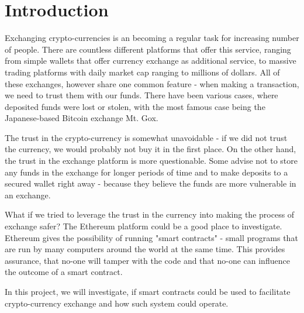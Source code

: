 \section{Introduction}
% 
Exchanging crypto-currencies is an becoming a regular task for increasing number of people. There are countless different platforms that offer this service, ranging from simple wallets that offer currency exchange as additional service, to massive trading platforms with daily market cap ranging to millions of dollars. All of these exchanges, however share one common feature - when making a transaction, we need to trust them with our funds. There have been various cases, where deposited funds were lost or stolen, with the most famous case being the Japanese-based Bitcoin exchange Mt. Gox.

The trust in the crypto-currency is somewhat unavoidable - if we did not trust the currency, we would probably not buy it in the first place. On the other hand, the trust in the exchange platform is more questionable. Some advise not to store any funds in the exchange for longer periods of time and to make deposits to a secured wallet right away - because they believe the funds are more vulnerable in an exchange.
% 
% 

What if we tried to leverage the trust in the currency into making the process of exchange safer? The Ethereum platform could be a good place to investigate. Ethereum gives the possibility of running "smart contracts" - small programs that are run by many computers around the world at the same time. This provides assurance, that no-one will tamper with the code and that no-one can influence the outcome of a smart contract. 
% 
% 

In this project, we will investigate, if smart contracts could be used to facilitate crypto-currency exchange and how such system could operate.